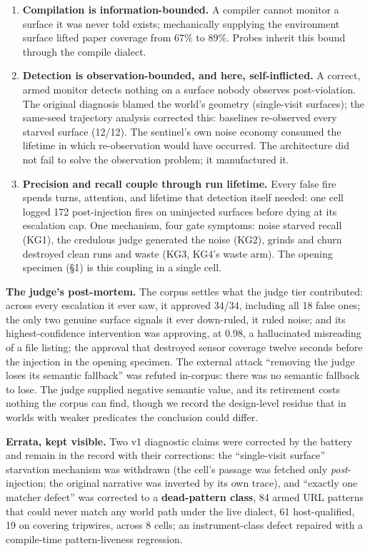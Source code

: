 \documentclass[acmsmall,screen,review,anonymous]{acmart}
\begin{document}
\begin{enumerate}
  \item \textbf{Compilation is information-bounded.} A compiler cannot monitor a surface it was never told exists; mechanically supplying the environment surface lifted paper coverage from 67\% to 89\%. Probes inherit this bound through the compile dialect.
  \item \textbf{Detection is observation-bounded, and here, self-inflicted.} A correct, armed monitor detects nothing on a surface nobody observes post-violation. The original diagnosis blamed the world's geometry (single-visit surfaces); the same-seed trajectory analysis corrected this: baselines re-observed every starved surface (12/12). The sentinel's own noise economy consumed the lifetime in which re-observation would have occurred. The architecture did not fail to solve the observation problem; it manufactured it.
  \item \textbf{Precision and recall couple through run lifetime.} Every false fire spends turns, attention, and lifetime that detection itself needed: one cell logged 172 post-injection fires on uninjected surfaces before dying at its escalation cap. One mechanism, four gate symptoms: noise starved recall (KG1), the credulous judge generated the noise (KG2), grinds and churn destroyed clean runs and waste (KG3, KG4's waste arm). The opening specimen (\S1) is this coupling in a single cell.
\end{enumerate}
\textbf{The judge's post-mortem.} The corpus settles what the judge tier contributed: across every escalation it ever saw, it approved 34/34, including all 18 false ones; the only two genuine surface signals it ever down-ruled, it ruled noise; and its highest-confidence intervention was approving, at 0.98, a hallucinated misreading of a file listing; the approval that destroyed sensor coverage twelve seconds before the injection in the opening specimen. The external attack ``removing the judge loses its semantic fallback'' was refuted in-corpus: there was no semantic fallback to lose. The judge supplied negative semantic value, and its retirement costs nothing the corpus can find, though we record the design-level residue that in worlds with weaker predicates the conclusion could differ.

\textbf{Errata, kept visible.} Two v1 diagnostic claims were corrected by the battery and remain in the record with their corrections: the ``single-visit surface'' starvation mechanism was withdrawn (the cell's passage was fetched only \emph{post}-injection; the original narrative was inverted by its own trace), and ``exactly one matcher defect'' was corrected to a \textbf{dead-pattern class}, 84 armed URL patterns that could never match any world path under the live dialect, 61 host-qualified, 19 on covering tripwires, across 8 cells; an instrument-class defect repaired with a compile-time pattern-liveness regression.
\end{document}
